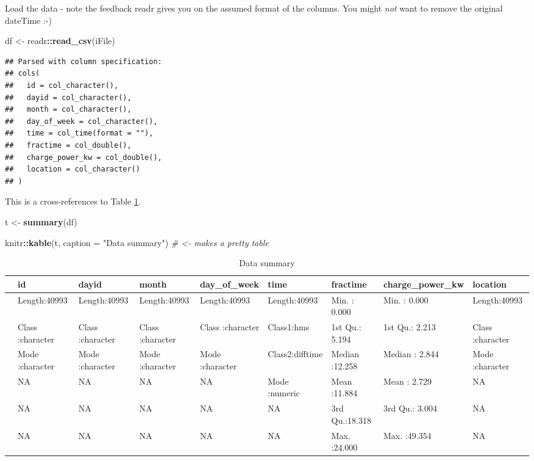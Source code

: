 \documentclass[]{article}
\newenvironment{Shaded}{\begin{snugshade}}{\end{snugshade}}
\newcommand{\KeywordTok}[1]{\textcolor[rgb]{0.13,0.29,0.53}{\textbf{#1}}}
\newcommand{\DataTypeTok}[1]{\textcolor[rgb]{0.13,0.29,0.53}{#1}}
\newcommand{\StringTok}[1]{\textcolor[rgb]{0.31,0.60,0.02}{#1}}
\newcommand{\CommentTok}[1]{\textcolor[rgb]{0.56,0.35,0.01}{\textit{#1}}}
\newcommand{\OperatorTok}[1]{\textcolor[rgb]{0.81,0.36,0.00}{\textbf{#1}}}
\newcommand{\NormalTok}[1]{#1}
\begin{document}
Load the data - note the feedback readr gives you on the assumed format
of the columns. You might \emph{not} want to remove the original
dateTime :-)

\begin{Shaded}
\begin{Highlighting}[]
\NormalTok{df <-}\StringTok{ }\NormalTok{readr}\OperatorTok{::}\KeywordTok{read_csv}\NormalTok{(iFile)}
\end{Highlighting}
\end{Shaded}

\begin{verbatim}
## Parsed with column specification:
## cols(
##   id = col_character(),
##   dayid = col_character(),
##   month = col_character(),
##   day_of_week = col_character(),
##   time = col_time(format = ""),
##   fractime = col_double(),
##   charge_power_kw = col_double(),
##   location = col_character()
## )
\end{verbatim}

This is a cross-references to Table \ref{tab:tab1}.

\begin{Shaded}
\begin{Highlighting}[]
\NormalTok{t <-}\StringTok{ }\KeywordTok{summary}\NormalTok{(df)}

\NormalTok{knitr}\OperatorTok{::}\KeywordTok{kable}\NormalTok{(t, }\DataTypeTok{caption =} \StringTok{"Data summary"}\NormalTok{) }\CommentTok{# <- makes a pretty table}
\end{Highlighting}
\end{Shaded}

\begin{table}

\caption{\label{tab:tab1}Data summary}
\centering
\begin{tabular}[t]{l|l|l|l|l|l|l|l|l}
\hline
  &      id &    dayid &    month & day\_of\_week &     time &    fractime & charge\_power\_kw &   location\\
\hline
 & Length:40993 & Length:40993 & Length:40993 & Length:40993 & Length:40993 & Min.   : 0.000 & Min.   : 0.000 & Length:40993\\
\hline
 & Class :character & Class :character & Class :character & Class :character & Class1:hms & 1st Qu.: 5.194 & 1st Qu.: 2.213 & Class :character\\
\hline
 & Mode  :character & Mode  :character & Mode  :character & Mode  :character & Class2:difftime & Median :12.258 & Median : 2.844 & Mode  :character\\
\hline
 & NA & NA & NA & NA & Mode  :numeric & Mean   :11.884 & Mean   : 2.729 & NA\\
\hline
 & NA & NA & NA & NA & NA & 3rd Qu.:18.318 & 3rd Qu.: 3.004 & NA\\
\hline
 & NA & NA & NA & NA & NA & Max.   :24.000 & Max.   :49.354 & NA\\
\hline
\end{tabular}
\end{table}
\end{document}
